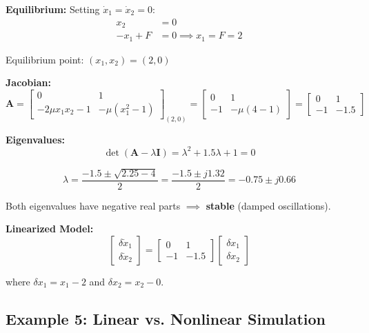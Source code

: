 \textbf{Equilibrium:} Setting $\dot{x}_1 = \dot{x}_2 = 0$:
\begin{align}
x_2 &= 0 \\
-x_1 + F &= 0 \implies x_1 = F = 2
\end{align}

Equilibrium point: $(x_1, x_2) = (2, 0)$

\textbf{Jacobian:}
\begin{equation}
\mathbf{A} = \begin{bmatrix} 0 & 1 \\ -2\mu x_1 x_2 - 1 & -\mu(x_1^2 - 1) \end{bmatrix}_{(2,0)} = \begin{bmatrix} 0 & 1 \\ -1 & -\mu(4-1) \end{bmatrix} = \begin{bmatrix} 0 & 1 \\ -1 & -1.5 \end{bmatrix}
\end{equation}

\textbf{Eigenvalues:}
\begin{equation}
\det(\mathbf{A} - \lambda\mathbf{I}) = \lambda^2 + 1.5\lambda + 1 = 0
\end{equation}

\begin{equation}
\lambda = \frac{-1.5 \pm \sqrt{2.25 - 4}}{2} = \frac{-1.5 \pm j1.32}{2} = -0.75 \pm j0.66
\end{equation}

Both eigenvalues have negative real parts $\implies$ \textbf{stable} (damped oscillations).

\textbf{Linearized Model:}
\begin{equation}
\begin{bmatrix} \delta\dot{x}_1 \\ \delta\dot{x}_2 \end{bmatrix} = \begin{bmatrix} 0 & 1 \\ -1 & -1.5 \end{bmatrix} \begin{bmatrix} \delta x_1 \\ \delta x_2 \end{bmatrix}
\end{equation}

where $\delta x_1 = x_1 - 2$ and $\delta x_2 = x_2 - 0$.

\hrulefill

\subsection{Example 5: Linear vs. Nonlinear Simulation}


